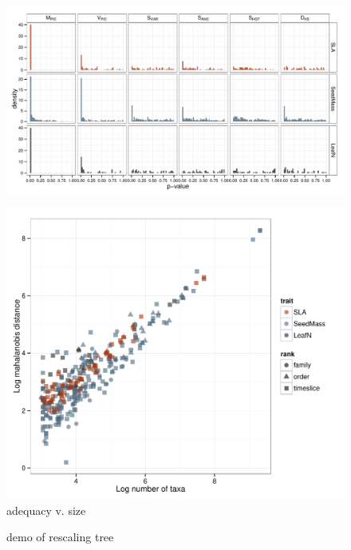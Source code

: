 \documentclass[a4paper,12pt]{article}
\begin{document}
\begin{figure}[p]
  \centering
  \includegraphics[angle=90, origin=c]{figs/pvalue-hist-ML}
  \label{fig:pvalues}
\end{figure}

\begin{figure}[p]
  \centering
  \includegraphics[scale=0.9]{figs/Size-adequacy-ML-bestonly}
  \caption{adequacy v. size}
  \label{fig:size-adequacy}
\end{figure}

\renewcommand\thefigure{Box\arabic{figure}}
\renewcommand\thetable{Box \arabic{table}}
\setcounter{figure}{0}    
\setcounter{table}{0} 

\begin{figure}[p]
  \centering
  \caption{demo of rescaling tree}
  \label{fig:box1}
\end{figure}
\end{document}
